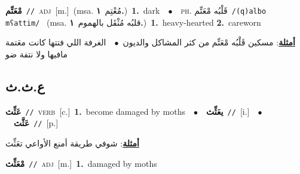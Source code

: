 \documentclass[10pt,a4paper,twoside]{article} %
\begin{document}
\begin{multicols}{2}
{{{{{{{{{{{{\setlength\topsep{0pt}\textbf{\foreignlanguage{arabic}{مْعَتِّم}}\ {\color{gray}\texttt{//}\color{black}}\ \textsc{adj}\ [m.]\ \color{gray}(msa. \foreignlanguage{arabic}{مُعْتِم}~\foreignlanguage{arabic}{\textbf{١.}})\color{black}\ \textbf{1.}~dark\ \ $\bullet$\ \ \textsc{ph.} \color{gray} \foreignlanguage{arabic}{قَلْبُه مْعَتِّم}\color{black}\ {\color{gray}\texttt{/{\sffamily (q)albo mʕattim}/}\color{black}}\ \color{gray} (msa. \foreignlanguage{arabic}{قلبُه مُثْقَل بالهموم}~\foreignlanguage{arabic}{\textbf{١.}})\color{black}\ \textbf{1.}~heavy-hearted  \textbf{2.}~careworn\  \begin{flushright}\color{gray}\foreignlanguage{arabic}{\textbf{\underline{\foreignlanguage{arabic}{أمثلة}}}: مسكين قَلْبُه مْعَتِّم من كثر المشاكل والديون\ $\bullet$\ \  الغرفة اللي فتتها كانت معَتمة مافيها ولا نتفة ضو}\end{flushright}\color{black}} \vspace{2mm}

\vspace{-3mm}
\subsection*{\color{blue}\foreignlanguage{arabic}{ع.ث.ث}\color{blue}{}} 

{\setlength\topsep{0pt}\textbf{\foreignlanguage{arabic}{عَثِّث}}\ {\color{gray}\texttt{//}\color{black}}\ \textsc{verb}\ [c.]\ \textbf{1.}~become damaged by moths\ \ $\bullet$\ \ \setlength\topsep{0pt}\textbf{\foreignlanguage{arabic}{يعَثِّث}}\ {\color{gray}\texttt{//}\color{black}}\ [i.]\ \ $\bullet$\ \ \setlength\topsep{0pt}\textbf{\foreignlanguage{arabic}{عَثَّث}}\ {\color{gray}\texttt{//}\color{black}}\ [p.]\  \begin{flushright}\color{gray}\foreignlanguage{arabic}{\textbf{\underline{\foreignlanguage{arabic}{أمثلة}}}: شوفي طريقة أمنع الأواعي تعَثِّث}\end{flushright}\color{black}} \vspace{2mm}

{\setlength\topsep{0pt}\textbf{\foreignlanguage{arabic}{مْعَثِّث}}\ {\color{gray}\texttt{//}\color{black}}\ \textsc{adj}\ [m.]\ \textbf{1.}~damaged by moths\ 

}}}}}}}}}}}}
\end{multicols}
\end{document}
